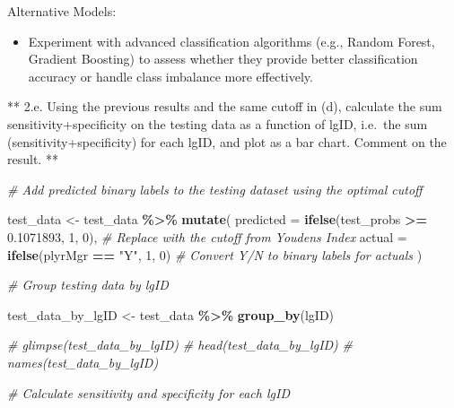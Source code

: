 \documentclass[
]{article}
\newenvironment{Shaded}{\begin{snugshade}}{\end{snugshade}}
\newcommand{\AttributeTok}[1]{\textcolor[rgb]{0.13,0.29,0.53}{#1}}
\newcommand{\CommentTok}[1]{\textcolor[rgb]{0.56,0.35,0.01}{\textit{#1}}}
\newcommand{\DecValTok}[1]{\textcolor[rgb]{0.00,0.00,0.81}{#1}}
\newcommand{\FloatTok}[1]{\textcolor[rgb]{0.00,0.00,0.81}{#1}}
\newcommand{\FunctionTok}[1]{\textcolor[rgb]{0.13,0.29,0.53}{\textbf{#1}}}
\newcommand{\NormalTok}[1]{#1}
\newcommand{\OtherTok}[1]{\textcolor[rgb]{0.56,0.35,0.01}{#1}}
\newcommand{\SpecialCharTok}[1]{\textcolor[rgb]{0.81,0.36,0.00}{\textbf{#1}}}
\newcommand{\StringTok}[1]{\textcolor[rgb]{0.31,0.60,0.02}{#1}}
\providecommand{\tightlist}{%
  \setlength{\itemsep}{0pt}\setlength{\parskip}{0pt}}
\begin{document}
Alternative Models:

\begin{itemize}
\tightlist
\item
  Experiment with advanced classification algorithms (e.g., Random
  Forest, Gradient Boosting) to assess whether they provide better
  classification accuracy or handle class imbalance more effectively.
\end{itemize}

** 2.e. Using the previous results and the same cutoff in (d), calculate
the sum sensitivity+specificity on the testing data as a function of
lgID, i.e.~the sum (sensitivity+specificity) for each lgID, and plot as
a bar chart. Comment on the result. **

\begin{Shaded}
\begin{Highlighting}[]
\CommentTok{\# Add predicted binary labels to the testing dataset using the optimal cutoff}

\NormalTok{test\_data }\OtherTok{\textless{}{-}}\NormalTok{ test\_data }\SpecialCharTok{\%\textgreater{}\%}
  \FunctionTok{mutate}\NormalTok{(}
    \AttributeTok{predicted =} \FunctionTok{ifelse}\NormalTok{(test\_probs }\SpecialCharTok{\textgreater{}=} \FloatTok{0.1071893}\NormalTok{, }\DecValTok{1}\NormalTok{, }\DecValTok{0}\NormalTok{),  }\CommentTok{\# Replace with the cutoff from Youden\textquotesingle{}s Index}
    \AttributeTok{actual =} \FunctionTok{ifelse}\NormalTok{(plyrMgr }\SpecialCharTok{==} \StringTok{"Y"}\NormalTok{, }\DecValTok{1}\NormalTok{, }\DecValTok{0}\NormalTok{)              }\CommentTok{\# Convert \textquotesingle{}Y\textquotesingle{}/\textquotesingle{}N\textquotesingle{} to binary labels for actuals}
\NormalTok{  )}

\CommentTok{\# Group testing data by lgID}

\NormalTok{test\_data\_by\_lgID }\OtherTok{\textless{}{-}}\NormalTok{ test\_data }\SpecialCharTok{\%\textgreater{}\%} \FunctionTok{group\_by}\NormalTok{(lgID)}

\CommentTok{\# glimpse(test\_data\_by\_lgID)}
\CommentTok{\# head(test\_data\_by\_lgID)}
\CommentTok{\# names(test\_data\_by\_lgID)}

\CommentTok{\# Calculate sensitivity and specificity for each lgID}


\end{Highlighting}
\end{Shaded}
\end{document}
